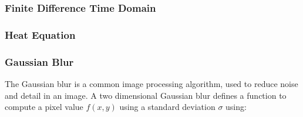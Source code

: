 

\subsubsection{Finite Difference Time Domain}

\subsubsection{Heat Equation}

\subsubsection{Gaussian Blur}


The Gaussian blur is a common image processing algorithm, used to
reduce noise and detail in an image. A two dimensional Gaussian blur
defines a function to compute a pixel value $f(x,y)$ using a standard
deviation $\sigma$ using:

